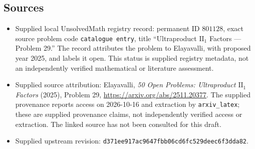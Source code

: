 \documentclass[11pt]{article}
\begin{document}
\subsection{Sources}
\begin{itemize}
\item Supplied local UnsolvedMath registry record: permanent ID \(801128\), exact source problem code \texttt{catalogue entry}, title ``Ultraproduct \(\mathrm{II}_1\) Factors --- Problem 29.'' The record attributes the problem to Elayavalli, with proposed year 2025, and labels it open. This status is supplied registry metadata, not an independently verified mathematical or literature assessment.
\item Supplied source attribution: Elayavalli, \emph{50 Open Problems: Ultraproduct \(\mathrm{II}_1\) Factors} (2025), Problem 29, \url{https://arxiv.org/abs/2511.20377}. The supplied provenance reports access on 2026-10-16 and extraction by \texttt{arxiv\_latex}; these are supplied provenance claims, not independently verified access or extraction. The linked source has not been consulted for this draft.
\item Supplied upstream revision: \texttt{d371ee917ac9647fbb06cd6fc529deec6f3dda82}.
\end{itemize}
\end{document}
